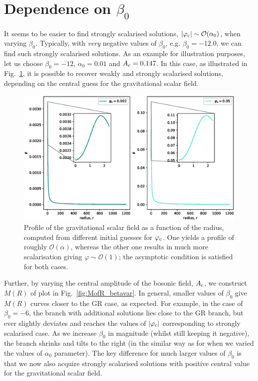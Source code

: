 \documentclass[12pt]{article}
\numberwithin{equation}{section}
\begin{document}
\section{Dependence on $\beta_0$} \label{sec:massless_sols_beta0}
It seems to be easier to find strongly scalarised solutions, $|\varphi_{\rm c}| \sim \mathcal{O}(\alpha_0)$, when varying $\beta_0$. Typically, with \textit{very} negative values of $\beta_0$, e.g. $\beta_0 = -12.0$, we can find such strongly scalarised solutions. As an example for illustration purposes, let us choose $\beta_0 = -12$, $\alpha_0 = 0.01$ and $A_{\rm{c}} = 0.147$. In this case, as illustrated in Fig.~\ref{model-beta-12}, it is possible to recover weakly and strongly scalarised solutions, depending on the central guess for the gravitational scalar field.

\begin{figure}
    \centering
    \includegraphics[width=15cm]{model-beta-12.eps}
    \caption{Profile of the gravitational scalar field as a function of the radius, computed from different initial guesses for $\varphi_{\rm{c}}$. One yields a profile of roughly $\mathcal{O}(\alpha)$, whereas the other one results in much more scalarisation giving $\varphi \sim \mathcal{O}(1)$; the asymptotic condition is satisfied for both cases.}
    \label{model-beta-12}
\end{figure}

Further, by varying the central amplitude of the bosonic field, $A_{\rm{c}}$, we construct $M(R)$ of plot in Fig.~\ref{fig:MofR_betavar}. In general, smaller values of $\beta_0$ give $M(R)$ curves closer to the GR case, as expected. For example, in the case of $\beta_0 = -6$, the branch with additional solutions lies close to the GR branch, but ever slightly deviates and reaches the values of $|\varphi_{\rm c}|$ corresponding to strongly scalarised case. As we increase $\beta_0$ in magnitude (whilst still keeping it negative), the branch shrinks and tilts to the right (in the similar way as for when we varied the values of $\alpha_0$ parameter). The key difference for much larger values of $\beta_0$ is that we now also acquire strongly scalarised solutions with positive central value for the gravitational scalar field.
\end{document}

